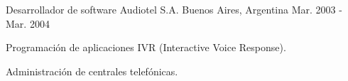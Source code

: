 \begin{cventries}
  \cventry
    {Desarrollador de software} %
    {Audiotel S.A.} %
    {Buenos Aires, Argentina} %
    {Mar. 2003 - Mar. 2004} %
    {
      \begin{cvitems}
        \item Programación de aplicaciones IVR (Interactive Voice Response).
        \item Administración de centrales telefónicas.
      \end{cvitems}
    }

\end{cventries}
